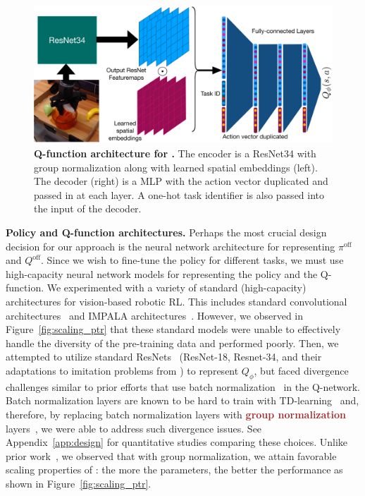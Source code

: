 \begin{figure}
\vspace{-0.5cm}
    \centering
    \setcounter{figure}{1}
  \includegraphics[width=0.85\linewidth]{chapters/ptr/architecture.pdf}
  \caption{\footnotesize{\textbf{Q-function architecture for \ptrmethodname.} The encoder is a ResNet34 with group normalization along with learned spatial embeddings (left). The decoder (right) is a MLP with the action vector duplicated and passed in at each layer. A one-hot task identifier is also passed into the input of the decoder.}}
  \vspace{-1.0cm}
  \label{fig:arch}
\end{figure}
\textbf{Policy and Q-function architectures.} Perhaps the most crucial design decision for our approach is the neural network architecture for representing $\pi^\text{off}$ and $Q^\text{off}$. Since we wish to fine-tune the policy for different tasks, we must use high-capacity neural network models for representing the policy and the Q-function. We experimented with a variety of standard (high-capacity) architectures for vision-based robotic RL. This includes standard convolutional architectures~\citep{singh2020cog} and IMPALA architectures~\citep{espeholt2018impala}. However, we observed in Figure~\ref{fig:scaling_ptr} that these {standard models were unable to effectively handle the diversity of the pre-training data} and performed poorly.
Then, we attempted to utilize standard ResNets~\citep{resnet} (ResNet-18, Resnet-34, and their adaptations to imitation problems from \citet{ebert2021bridge}) to represent $Q_\phi$, but faced divergence challenges similar to prior efforts that use batch normalization~\citep{bjorck2021towards,2019arXiv190205605B} in the Q-network. Batch normalization layers are known to be hard to train with TD-learning~\citep{2019arXiv190205605B} and, therefore, by replacing batch normalization layers with \textcolor{brown}{\textbf{group normalization}} layers~\citep{wu2018group}, we were able to address such divergence issues.
See Appendix~\ref{app:design} for quantitative studies comparing these choices. Unlike prior work~\citep{lee2022multi}, we observed that with group normalization, we attain favorable scaling properties of \ptrmethodname: the more the parameters, the better the performance as shown in Figure~\ref{fig:scaling_ptr}.
